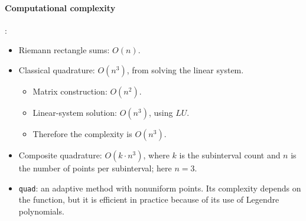 \paragraph{Computational complexity}:
\begin{itemize}
    \item Riemann rectangle sums: \( O(n) \).
    \item Classical quadrature: \( O(n^3) \), from solving the linear system.
    \begin{itemize}
        \item Matrix construction: $O(n^2)$.
        \item Linear-system solution: $O(n^3)$, using $LU$.
        \item Therefore the complexity is $O(n^3)$.
    \end{itemize}
    \item Composite quadrature: \( O(k \cdot n^3) \), where \( k \) is the subinterval count and \( n \) is the number of points per subinterval; here \(n=3\).
    \item \texttt{quad}: an adaptive method with nonuniform points. Its complexity depends on the function, but it is efficient in practice because of its use of Legendre polynomials.
\end{itemize}


